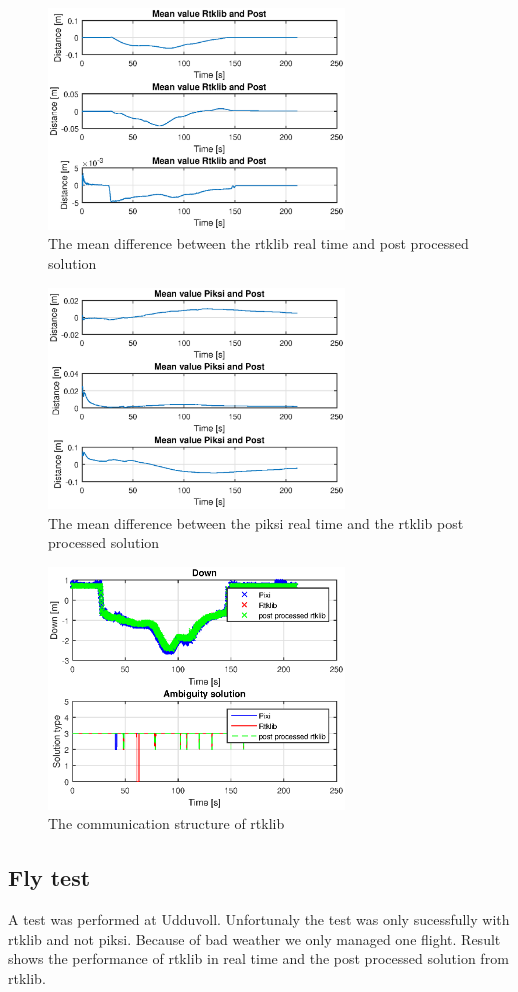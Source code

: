 \begin{figure}[H]
	\centering
		\includegraphics[width=0.7\textwidth]{figs/plots/meanrtkpost.eps}
		\caption{The mean difference between the rtklib real time and post processed solution}
		\label{figure:RTKLIB_STRUCTURE}
\end{figure}
\begin{figure}[H]
	\centering
		\includegraphics[width=0.7\textwidth]{figs/plots/meanpiksipost.eps}
		\caption{The mean difference between the piksi real time and the rtklib post processed solution}
		\label{figure:RTKLIB_STRUCTURE}
\end{figure}
\begin{figure}[H]
	\centering
		\includegraphics[width=0.7\textwidth]{figs/plots/down.eps}
		\caption{The communication structure of rtklib}
		\label{figure:RTKLIB_STRUCTURE}
\end{figure}
\subsection{Fly test}
A test was performed at Udduvoll. Unfortunaly the test was only sucessfully with rtklib and not piksi. Because of bad weather we only managed one flight. Result shows the performance of rtklib in real time and the post processed solution from rtklib.
\cleardoublepage